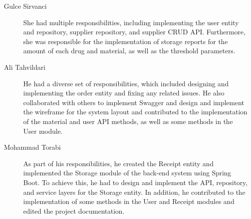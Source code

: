 \begin{description}
   \item[Gulce Sirvanci] She had multiple responsibilities, including implementing the user entity and repository, supplier repository, and supplier CRUD API. Furthermore, she was responsible for the implementation of storage reports for the amount of each drug and material, as well as the threshold parameters.

   \item[Ali Tahvildari] He had a diverse set of responsibilities, which included designing and implementing the order entity and fixing any related issues. He also collaborated with others to implement Swagger and design and implement the wireframe for the system layout and contributed to the implementation of the material and user API methods, as well as some methods in the User module.

   \item[Mohammad Torabi] As part of his responsibilities, he created the Receipt entity and implemented the Storage module of the back-end system using Spring Boot. To achieve this, he had to design and implement the API, repository, and service layers for the Storage entity. In addition, he contributed to the implementation of some methods in the User and Receipt modules and edited the project documentation.

\end{description}
